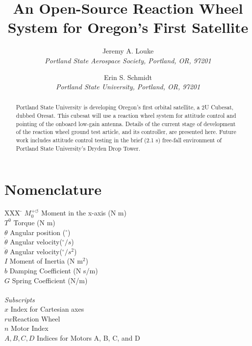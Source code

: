 \documentclass[]{aiaa-tc}%
\title{An Open-Source Reaction Wheel System for Oregon's First Satellite}
\author{
  Jeremy A. Louke\\
  {\normalsize\itshape
   Portland State Aerospace Society, Portland, OR, 97201}\\
  \and
  Erin S. Schmidt\\
  {\normalsize\itshape
  Portland State University, Portland, OR, 97201}
 }
\begin{document}
\maketitle

\begin{abstract}
Portland State University is developing Oregon's first orbital satellite, a 2U Cubesat, dubbed Oresat. This cubesat will use a reaction wheel system for attitude control and pointing of the onboard low-gain antenna. Details of the current stage of development of the reaction wheel ground test article, and its controller, are presented here. Future work includes attitude control testing in the brief (2.1 s) free-fall environment of Portland State University's Dryden Drop Tower.
\end{abstract}

\section*{Nomenclature}

\begin{tabbing}
  XXX \= \kill%
  $M_0^{+ \circlearrowleft}$ \qquad Moment in the x-axis (N m)\\
  $T^0$ \qquad Torque (N m)\\
  $\theta$ \qquad Angular position (${}^{\circ}$)\\
  $\dot{\theta}$ \qquad Angular velocity(${}^{\circ}/s$)\\ 
  $\ddot{\theta}$ \qquad Angular velocity(${}^{\circ}/s^2$) \\
  $I$ \qquad Moment of Inertia (N $\textrm{m}^2$)\\
  $b$ \qquad Damping Coefficient (N s/m)\\ 
  $G$ \qquad Spring Coefficient (N/m)\\ \\
  \textit{Subscripts}\\
  $x$ \qquad Index for Cartesian axes \\
  $rw$\qquad Reaction Wheel\\
  $n$ \qquad Motor Index\\
  $A, B, C, D$ \qquad Indices for Motors A, B, C, and D\\
 \end{tabbing}
\end{document}
